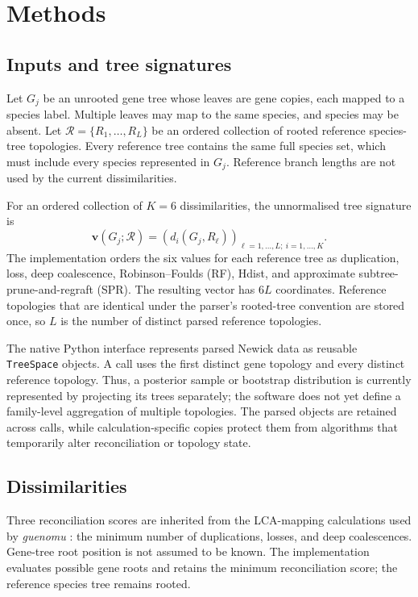 \section{Methods}

\subsection{Inputs and tree signatures}

Let $G_j$ be an unrooted gene tree whose leaves are gene copies, each mapped to a species label. Multiple leaves may map
to the same species, and species may be absent. Let $\mathcal{R}=\{R_1,\ldots,R_L\}$ be an ordered collection of rooted
reference species-tree topologies. Every reference tree contains the same full species set, which must include every
species represented in $G_j$. Reference branch lengths are not used by the current dissimilarities.

For an ordered collection of $K=6$ dissimilarities, the unnormalised tree signature is
\begin{equation}
  \mathbf{v}(G_j;\mathcal{R}) =
  \left(d_i(G_j,R_\ell)\right)_{\ell=1,\ldots,L;\ i=1,\ldots,K}.
  \label{eq:signature}
\end{equation}
The implementation orders the six values for each reference tree as duplication, loss, deep coalescence,
Robinson--Foulds (RF), Hdist, and approximate subtree-prune-and-regraft (SPR). The resulting vector has $6L$
coordinates. Reference topologies that are identical under the parser's rooted-tree convention are stored once, so $L$
is the number of distinct parsed reference topologies.

The native Python interface represents parsed Newick data as reusable \texttt{TreeSpace} objects. A call uses the first
distinct gene topology and every distinct reference topology. Thus, a posterior sample or bootstrap distribution is
currently represented by projecting its trees separately; the software does not yet define a family-level aggregation
of multiple topologies. The parsed objects are retained across calls, while calculation-specific copies protect them
from algorithms that temporarily alter reconciliation or topology state.

\subsection{Dissimilarities}

Three reconciliation scores are inherited from the LCA-mapping calculations used by \textit{guenomu}
\citep{Martins2016}: the minimum number of duplications, losses, and deep coalescences. Gene-tree root position is not
assumed to be known. The implementation evaluates possible gene roots and retains the minimum reconciliation score; the
reference species tree remains rooted.

